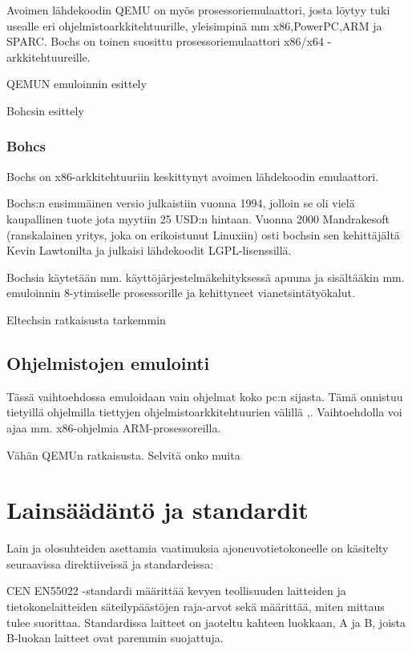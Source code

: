 \documentclass[11pt,a4paper,oneside,article]{memoir}
\begin{document}
Avoimen lähdekoodin QEMU on myös prosessoriemulaattori, josta löytyy tuki usealle eri ohjelmistoarkkitehtuurille, yleisimpinä mm x86,PowerPC,ARM ja SPARC. Bochs on toinen suosittu prosessoriemulaattori x86/x64 -arkkitehtuureille.

\lipsum[1-5]

QEMUN emuloinnin esittely

Bohcsin esittely
\subsection{Bohcs}
Bochs on x86-arkkitehtuuriin keskittynyt avoimen lähdekoodin emulaattori.

Bochs:n ensimmäinen versio julkaistiin vuonna 1994, jolloin se oli vielä kaupallinen tuote jota myytiin 25 USD:n hintaan. Vuonna 2000 Mandrakesoft (ranskalainen yritys, joka on erikoistunut Linuxiin) osti bochsin sen kehittäjältä Kevin Lawtonilta ja julkaisi lähdekoodit LGPL-lisenssillä.

Bochsia käytetään mm. käyttöjärjestelmäkehityksessä apuuna ja sisältääkin mm. emuloinnin 8-ytimiselle prosessorille ja kehittyneet vianetsintätyökalut.


Eltechsin ratkaisusta tarkemmin


\section{Ohjelmistojen emulointi}

Tässä vaihtoehdossa emuloidaan vain ohjelmat koko pc:n sijasta. Tämä onnistuu tietyillä ohjelmilla tiettyjen ohjelmistoarkkitehtuurien välillä \cite{tinycc},\cite{qemu_use}. Vaihtoehdolla voi ajaa mm. x86-ohjelmia ARM-prosessoreilla.

Vähän QEMUn ratkaisusta. Selvitä onko muita

\lipsum[1-5]

\newpage

\chapter{Lainsäädäntö ja standardit}

Lain ja olosuhteiden asettamia vaatimuksia ajoneuvotietokoneelle on käsitelty seuraavissa direktiiveissä ja standardeissa:

CEN EN55022 -standardi määrittää kevyen teollisuuden laitteiden ja tietokonelaitteiden säteilypäästöjen raja-arvot sekä määrittää, miten mittaus tulee suorittaa. Standardissa laitteet on jaoteltu kahteen luokkaan, A ja B, joista B-luokan laitteet ovat paremmin suojattuja.\cite{EN55022}
\end{document}

